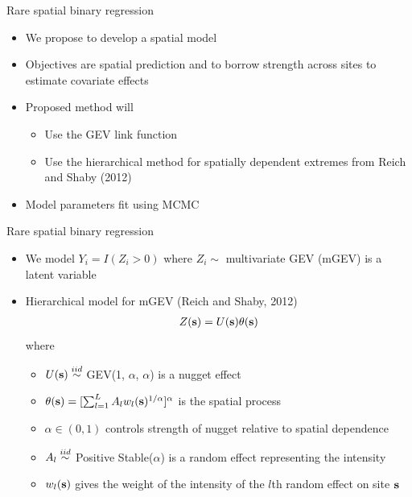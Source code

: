 \documentclass{beamer}
\begin{document}
\begin{frame}{Rare spatial binary regression}
  \begin{itemize} \setlength{\itemsep}{1em}
    \item We propose to develop a spatial model
    \item Objectives are spatial prediction and to borrow strength across sites to estimate covariate effects
    \item Proposed method will \vspace{0.5em}
    \begin{itemize} \setlength{\itemsep}{0.5em}
      \item Use the GEV link function
      \item Use the hierarchical method for spatially dependent extremes from Reich and Shaby (2012)
    \end{itemize}
    \item Model parameters fit using MCMC
  \end{itemize}
\end{frame}

\begin{frame}{Rare spatial binary regression}
  \begin{itemize} \setlength{\itemsep}{1em}
    \item We model $Y_i = I(Z_i > 0)$ where $Z_i\sim$ multivariate GEV (mGEV)  is a latent variable
    \item Hierarchical model for mGEV (Reich and Shaby, 2012)
    \begin{align*}
      Z(\mbox{\bf s}) = U(\mbox{\bf s}) \theta(\mbox{\bf s})
    \end{align*}
    where
    \begin{itemize} \setlength{\itemsep}{0.25em}
      \item $U(\mbox{\bf s}) \stackrel{iid}{\sim}$ GEV(1, $\alpha$, $\alpha$) is a nugget effect
      \item $\theta(\mbox{\bf s}) = [\sum_{l = 1}^L A_l w_l(\mbox{\bf s})^{1/\alpha}]^\alpha$ is the spatial process
      \item $\alpha \in (0, 1)$ controls strength of nugget relative to spatial dependence
      \item $A_l \stackrel{iid}{\sim}$ Positive Stable($\alpha$) is a random effect representing the intensity
      \item $w_l(\mbox{\bf s})$ gives the weight of the intensity of the $l$th random effect on site $\mbox{\bf s}$
    \end{itemize}
  \end{itemize}
\end{frame}
\end{document}
